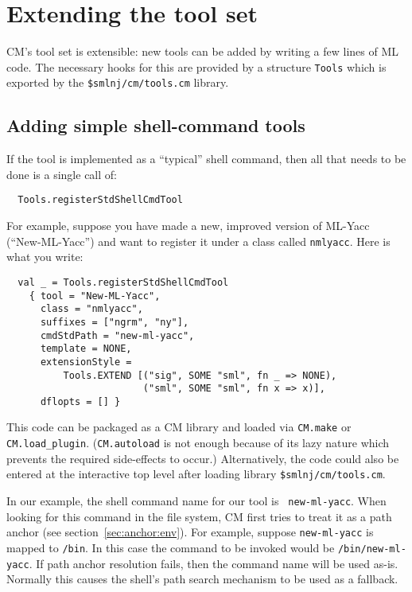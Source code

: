 
\section{Extending the tool set}
\label{sec:moretools}

CM's tool set is extensible: new tools can be added by writing a few
lines of ML code.  The necessary hooks for this are provided by a
structure {\tt Tools} which is exported by the {\tt \$smlnj/cm/tools.cm}
library.

\subsection{Adding simple shell-command tools}
\label{sec:addshellclass}

If the tool is implemented as a ``typical'' shell command, then all
that needs to be done is a single call of:

\begin{verbatim}
  Tools.registerStdShellCmdTool
\end{verbatim}

For example, suppose you have made a
new, improved version of ML-Yacc (``New-ML-Yacc'') and want to
register it under a class called {\tt nmlyacc}.  Here is what you
write:

\begin{verbatim}
  val _ = Tools.registerStdShellCmdTool
    { tool = "New-ML-Yacc",
      class = "nmlyacc",
      suffixes = ["ngrm", "ny"],
      cmdStdPath = "new-ml-yacc",
      template = NONE,
      extensionStyle =
          Tools.EXTEND [("sig", SOME "sml", fn _ => NONE),
                        ("sml", SOME "sml", fn x => x)],
      dflopts = [] }
\end{verbatim}

This code can be packaged as a CM library and loaded via {\tt CM.make}
or {\tt CM.load\_plugin}.  ({\tt CM.autoload} is not enough because of
its lazy nature which prevents the required side-effects to occur.)
Alternatively, the code could also be entered at the interactive top
level after loading library {\tt \$smlnj/cm/tools.cm}.

In our example, the shell command name for our tool is {\tt
new-ml-yacc}.  When looking for this command in the file system, CM
first tries to treat it as a path anchor (see
section~\ref{sec:anchor:env}).  For example, suppose {\tt new-ml-yacc} is
mapped to {\tt /bin}.  In this case the command to be
invoked would be {\tt /bin/new-ml-yacc}.  If path anchor resolution
fails, then the command name will be used as-is.  Normally this
causes the shell's path search mechanism to be used as a fallback.

